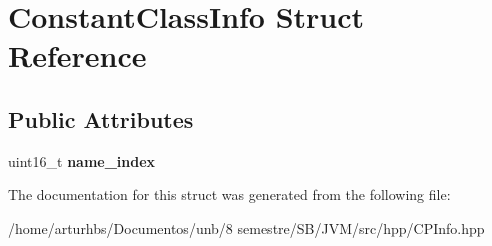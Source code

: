 \hypertarget{structConstantClassInfo}{}\section{Constant\+Class\+Info Struct Reference}
\label{structConstantClassInfo}
\subsection*{Public Attributes}
\begin{DoxyCompactItemize}
\item 
uint16\+\_\+t {\bfseries name\+\_\+index}\hypertarget{structConstantClassInfo_a691eabaa91856df4e408425764b9515e}{}\label{structConstantClassInfo_a691eabaa91856df4e408425764b9515e}

\end{DoxyCompactItemize}


The documentation for this struct was generated from the following file\+:\begin{DoxyCompactItemize}
\item 
/home/arturhbs/\+Documentos/unb/8 semestre/\+S\+B/\+J\+V\+M/src/hpp/C\+P\+Info.\+hpp\end{DoxyCompactItemize}
